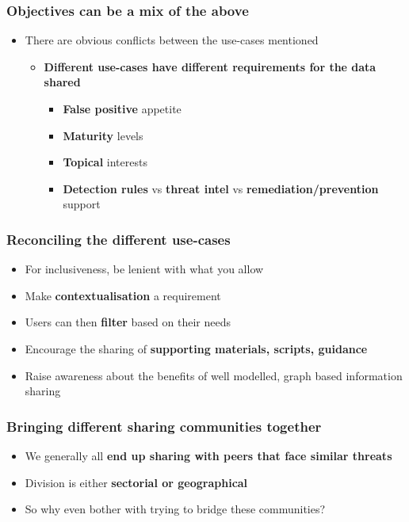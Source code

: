 \begin{frame}
\frametitle{Objectives can be a mix of the above}
\begin{itemize}
	\item There are obvious conflicts between the use-cases mentioned
	\begin{itemize}
		\item {\bf Different use-cases have different requirements for the data shared}
        	\begin{itemize}
			\item {\bf False positive} appetite
			\item {\bf Maturity} levels
			\item {\bf Topical} interests
			\item {\bf Detection rules} vs {\bf threat intel} vs {\bf remediation/prevention} support
		\end{itemize}
	\end{itemize}
\end{itemize}
\end{frame}

\begin{frame}
\frametitle{Reconciling the different use-cases}
\begin{itemize}
	\item For inclusiveness, be lenient with what you allow
	\item Make {\bf contextualisation} a requirement
	\item Users can then {\bf filter} based on their needs
	\item Encourage the sharing of {\bf supporting materials, scripts, guidance}
	\item Raise awareness about the benefits of well modelled, graph based information sharing
\end{itemize}
\end{frame}

\begin{frame}
\frametitle{Bringing different sharing communities together}
\begin{itemize}
	\item We generally all {\bf end up sharing with peers that face similar threats}
	\item Division is either {\bf sectorial or geographical}
	\item So why even bother with trying to bridge these communities?
\end{itemize}
\end{frame}

